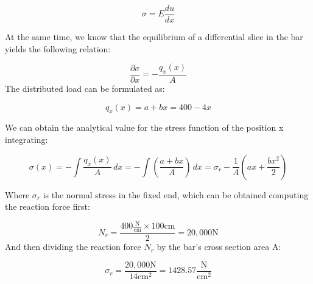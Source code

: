 \[
  \sigma = E \frac{du}{dx}
\]

At the same time, we know that the equilibrium of a differential slice in the bar yields the following relation:

\[
  \frac{\partial \sigma}{\partial x} = - \frac{q_x(x)}{A}  
\]
The distributed load can be formulated as:

\[
  q_x(x) = a + bx = 400 - 4x
\]

We can obtain the analytical value for the stress function of the position x integrating:

\[
  \sigma(x) = - \int \frac{q_x(x)}{A} \,dx 
  = - \int \left( \frac{a + bx}{A} \right) \,dx 
  = \sigma_r - \frac{1}{A} \left( ax + \frac{b x^2}{2} \right)
\]

Where $\sigma_r$ is the normal stress in the fixed end, which can be obtained computing the reaction force first:

\[
  N_r = \frac{400 \frac{\text{N}}{\text{cm}} \times 100 \text{cm}}{2} = 20,000 \text{N}
\]
And then dividing the reaction force $N_r$ by the bar's cross section area A:

\[
  \sigma_r = \frac{20,000 \text{N}}{14 \text{cm}^2} = 1428.57 \frac{\text{N}}{\text{cm}^2}
\]